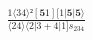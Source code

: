 \documentclass[varwidth, border=5pt]{standalone}
\begin{document}
\begin{my}
$\begin{gathered}
\scriptscriptstyle\frac{1⟨34⟩²[𝟓1][1|𝟓|𝟓⟩}{⟨24⟩⟨2|3+4|1]s_{234}}
\end{gathered}$
\end{my}
\end{document}
